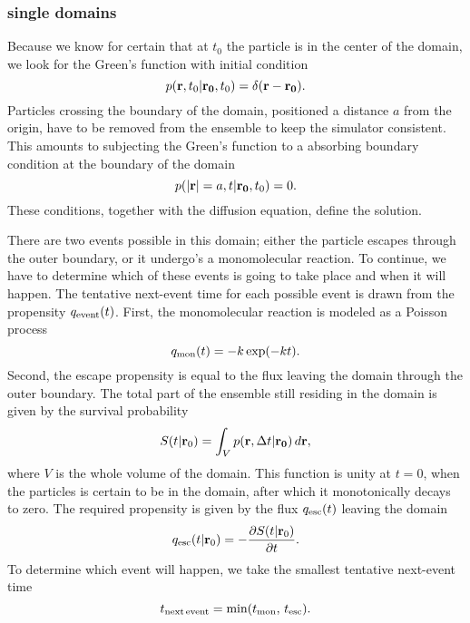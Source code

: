 \subsubsection{single domains}
Because we know for certain that at $t_0$ the particle is in the center of the domain, we look for the Green's function with initial condition
\begin{equation}
 p({\bf r}, t_0|{\bf r_0},t_0) = \delta(\mathbf{r - r_0}).
\end{equation}
Particles crossing the boundary of the domain, positioned a distance $a$ from the origin, have to be removed from the ensemble to keep the simulator consistent. This amounts to subjecting the Green's function to a absorbing boundary condition at the boundary of the domain
\begin{equation}
 p({\bf |r|}=a, t|{\bf r_0},t_0) = 0.
\end{equation}
These conditions, together with the diffusion equation, define the solution. \cite{Carslaw1959}\cite{Beck1992} 

There are two events possible in this domain; either the particle escapes through the outer boundary, or it undergo's a monomolecular reaction. To continue, we have to determine which of these events is going to take place and when it will happen. The tentative next-event time for each possible event is drawn from the propensity $q_{\rm event}(t)$. First, the monomolecular reaction is modeled as a Poisson process
\begin{equation}
 q_{\rm mon}(t) = -k\, {\rm exp}(-k t).
\end{equation}
Second, the escape propensity is equal to the flux leaving the domain through the outer boundary. 
The total part of the ensemble still residing in the domain is given by the survival probability
\begin{equation}
 S(t|{\mathbf r_0}) = \int_V p({\bf r}, \Delta t|{\bf r_0}) \, d{\mathbf r},
 \elabel{Surv}
\end{equation}
where $V$ is the whole volume of the domain. This function is unity at $t=0$, when the particles is certain to be in the domain, after which it monotonically decays to zero. The required propensity is given by the flux $q_{\rm esc}(t)$ leaving the domain
\begin{equation}
 q_{\rm esc}(t|{\mathbf r_0}) = -\pdiff{S(t|{\mathbf r_0})}{t}.
 \elabel{Sflux}
\end{equation}
To determine which event will happen, we take the smallest tentative next-event time
\begin{equation}
 t_{\rm next\,event} = {\rm min}(t_{\rm mon},\,t_{\rm esc}).
\end{equation}

